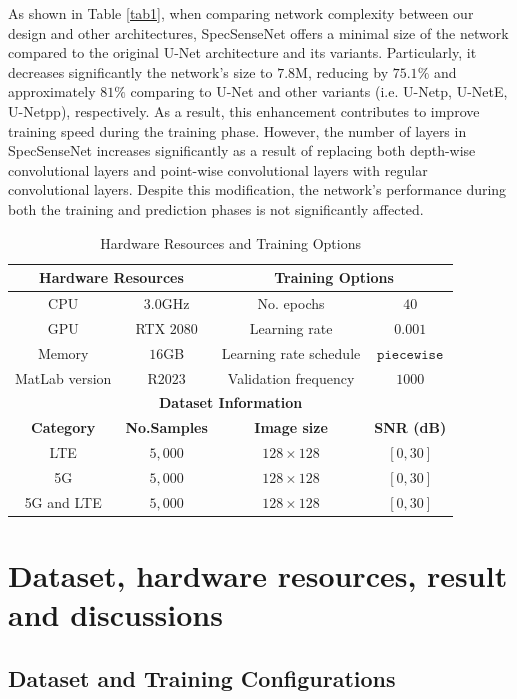 \documentclass[conference]{IEEEtran} %
\begin{document}
As shown in Table \ref{tab1}, when comparing network complexity between our design and other architectures, SpecSenseNet offers a minimal size of the network compared to the original U-Net architecture and its variants. Particularly, it decreases significantly the network's size to $7.8$M, reducing by $75.1\%$ and approximately $81\%$ comparing to U-Net and other variants (i.e. U-Netp, U-NetE, U-Netpp), respectively. As a result, this enhancement contributes to improve training speed during the training phase. However, the number of layers in SpecSenseNet increases significantly as a result of replacing both depth-wise convolutional layers and point-wise convolutional layers with regular convolutional layers. Despite this modification, the network's performance during both the training and prediction phases is not significantly affected.

\begin{table}[!t]
\centering
\caption{Hardware Resources and Training Options}
\label{tab2}
\begin{tabular}{c|c|c|c}
\hline
\multicolumn{2}{c|}{\textbf{Hardware Resources}} & \multicolumn{2}{c}{\textbf{Training Options}} \\ \hline
CPU & $3.0$GHz & No. epochs & $40$ \\ 
GPU & RTX $2080$ & Learning rate & $0.001$ \\
Memory & $16$GB & Learning rate schedule & $\mathtt{piecewise}$ \\ 
MatLab version & R$2023$ & Validation frequency & $1000$ \\
\hline
\multicolumn{4}{c}{\textbf{Dataset Information}} \\
\hline
\textbf{Category} & \textbf{No.Samples} & \textbf{Image size} & \textbf{SNR (dB)}\\
\hline
LTE         & $5,000$ & $128 \times 128$ & $[0, 30]$ \\
5G          & $5,000$ & $128 \times 128$ & $[0, 30]$ \\
5G and LTE  & $5,000$ & $128 \times 128$ & $[0, 30]$ \\
\hline
\end{tabular}
\end{table}

\section{Dataset, hardware resources, result and discussions}
\subsection{Dataset and Training Configurations}
\end{document}
